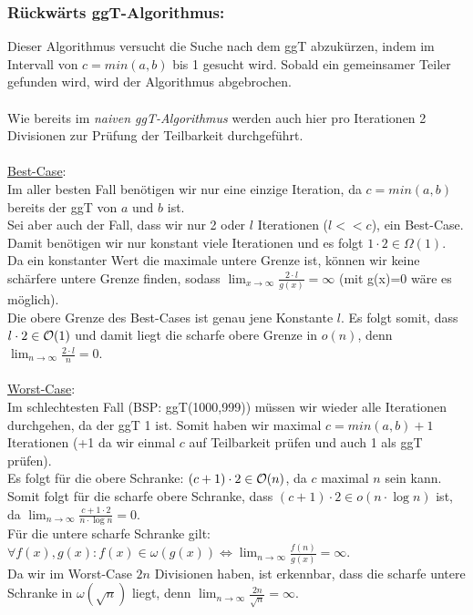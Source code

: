 \documentclass{llncs}
\begin{document}
\subsubsection*{Rückwärts ggT-Algorithmus:}
Dieser Algorithmus versucht die Suche nach dem ggT abzukürzen, indem im Intervall von $c=min(a,b)$  bis 1 gesucht wird. Sobald ein gemeinsamer Teiler gefunden wird, wird der Algorithmus abgebrochen.\\\\
Wie bereits im \textit{naiven ggT-Algorithmus} werden auch hier pro Iterationen 2 Divisionen zur Prüfung der Teilbarkeit durchgeführt.\\\\
\underline{Best-Case}:\\
Im aller besten Fall benötigen wir nur eine einzige Iteration, da $c=min(a,b)$ bereits der ggT von $a$ und $b$ ist. \\
Sei aber auch der Fall, dass wir nur 2 oder $l$ Iterationen ($l<<c$), ein Best-Case. Damit benötigen wir nur konstant viele Iterationen und es folgt $1\cdot 2 \in \Omega(1)$.\\
Da ein konstanter Wert die maximale untere Grenze ist, können wir keine schärfere untere Grenze finden, sodass $\lim_{x\to\infty}{\frac{2\cdot l}{g(x)}}=\infty$ (mit g(x)=0 wäre es möglich).\\
Die obere Grenze des Best-Cases ist genau jene Konstante $l$. Es folgt somit, dass $l\cdot 2 \in \mathcal{O}(1)$ und damit liegt die scharfe obere Grenze in $o(n)$, denn $\lim_{n\to\infty}{\frac{2\cdot l}{n}}=0$.\\\\
\underline{Worst-Case}:\\
Im schlechtesten Fall (BSP: ggT(1000,999)) müssen wir wieder alle Iterationen durchgehen, da der ggT 1 ist. Somit haben wir maximal $c=min(a,b)+1$ Iterationen (+1 da wir einmal $c$ auf Teilbarkeit prüfen und auch 1 als ggT prüfen). \\
Es folgt für die obere Schranke: $(c+1)\cdot 2 \in \mathcal{O}(n)$, da $c$ maximal $n$ sein kann. Somit folgt für die scharfe obere Schranke, dass $(c+1)\cdot 2 \in o(n\cdot\log{n})$ ist, da $\lim_{n\to\infty}{\frac{c+1\cdot 2}{n\cdot\log{n}}}=0$.\\
Für die untere scharfe Schranke gilt: $\forall f(x),g(x): f(x) \in \omega(g(x)) \Leftrightarrow \lim_{n\to\infty}{\frac{f(n)}{g(x)}}=\infty$. \\
Da wir im Worst-Case $2n$ Divisionen haben, ist erkennbar, dass die scharfe untere Schranke in $\omega(\sqrt{n})$ liegt, denn $\lim_{n\to\infty}{\frac{2n}{\sqrt{n}}}=\infty$.
\end{document}
